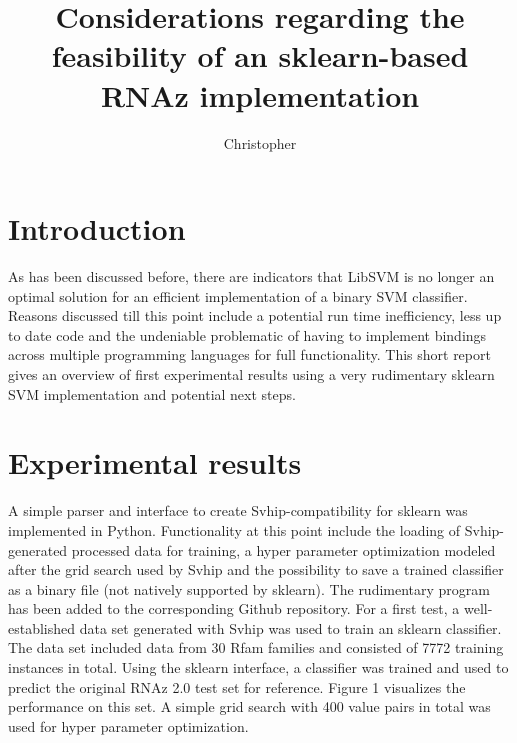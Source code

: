 \documentclass[]{article}
\title{Considerations regarding the feasibility of an sklearn-based RNAz implementation}
\author{Christopher}
\begin{document}
\maketitle

\section{Introduction}

As has been discussed before, there are indicators that LibSVM is no longer an optimal solution for an efficient implementation of a binary SVM classifier. Reasons discussed till this point include a potential run time inefficiency, less up to date code and the undeniable problematic of having to implement bindings across multiple programming languages for full functionality. This short report gives an overview of first experimental results using a very rudimentary sklearn SVM implementation and potential next steps. 

\section{Experimental results}

A simple parser and interface to create Svhip-compatibility for sklearn was implemented in Python. Functionality at this point include the loading of Svhip-generated processed data for training, a hyper parameter optimization modeled after the grid search used by Svhip and the possibility to save a trained classifier as a binary file (not natively supported by sklearn). The rudimentary program has been added to the corresponding Github repository. For a first test, a well-established data set generated with Svhip was used to train an sklearn classifier. The data set included data from 30 Rfam families and consisted of 7772 training instances in total. Using the sklearn interface, a classifier was trained and used to predict the original RNAz 2.0 test set for reference. Figure 1 visualizes the performance on this set.  A simple grid search with 400 value pairs in total was used for hyper parameter optimization. \newline
\end{document}
